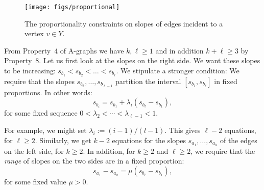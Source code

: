 \begin{figure*}
  \begin{center}
    \texttt{[image: figs/proportional]}
  \end{center}
  \caption{The proportionality constraints on slopes of edges incident to a vertex $v\in Y$.}
\end{figure*}
From Property~4 of A-graphs we have $k,\ell\ge1$ and in addition
 $k+\ell\ge 3$ by Property~8.
Let us first look at the slopes on the right side.
We want these slopes to be increasing:
$s_{b_1} < s_{b_2} < \dots  <s_{b_\ell}$. We stipulate a stronger
condition:
We require that the slopes
$s_{b_2}, \dots, s_{b_{\ell-1}}$ partition the interval
$[s_{b_1},s_{b_\ell}]$ in fixed proportions. In other words:
\begin{equation}
\label{eq:proportion}
s_{b_i} = s_{b_1} + \lambda_i(s_{b_{\ell}}-s_{b_1}),
\end{equation}
for some fixed sequence $0<\lambda_2<\cdots<\lambda_{\ell-1}<1$.

For example, we might set $\lambda_i := (i-1)/(l-1)$.
This gives $\ell-2$ equations, for $\ell\ge 2$. Similarly, we get
$k-2$ equations for the slopes
$s_{a_1}, \dots, s_{a_{k}}$ of the edges on the left side, for $k\ge 2$.
In addition, for $k\ge 2$ and $\ell\ge 2$, we require that the \emph{range} of
slopes
on the two sides are in a fixed proportion:
\begin{equation}
\label{eq:proportion2}
s_{a_1}-s_{a_{k}} = \mu (s_{b_{\ell}}-s_{b_1}),
\end{equation}
for some fixed value $\mu>0$.

